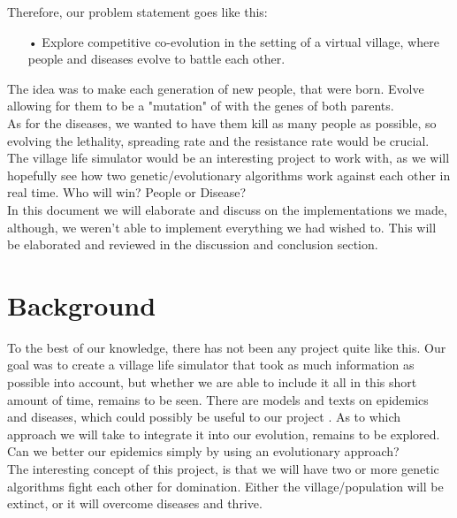 \documentclass[conference,compsoc]{IEEEtran}
\begin{document}
Therefore, our problem statement goes like this:\\
\begin{itemize}
\item[•]Explore competitive co-evolution in the setting of a virtual village, where people and diseases evolve to battle each other.
\end{itemize}

The idea was to make each generation of new people, that were born. Evolve allowing for them to be a "mutation" of with the genes of both parents.\\
As for the diseases, we wanted to have them kill as many people as possible, so evolving the lethality, spreading rate and the resistance rate would be crucial.\\

The village life simulator would be an interesting project to work with, as we will hopefully see how two genetic/evolutionary algorithms work against each other in real time. Who will win? People or Disease?\\

In this document we will elaborate and discuss on the implementations we made, although, we weren't able to implement everything we had wished to. This will be elaborated and reviewed in the discussion and conclusion section.\\

\section{Background}
To the best of our knowledge, there has not been any project quite like this. Our goal was to create a village life simulator that took as much information as possible into account, but whether we are able to include it all in this short amount of time, remains to be seen. There are models and texts on epidemics and diseases, which could possibly be useful to our project \cite{kermack1927contribution} \cite{jensen2010klinisk}. As to which approach we will take to integrate it into our evolution, remains to be explored. Can we better our epidemics simply by using an evolutionary approach?\\

The interesting concept of this project, is that we will have two or more genetic algorithms fight each other for domination. Either the village/population will be extinct, or it will overcome diseases and thrive.\\
\end{document}
